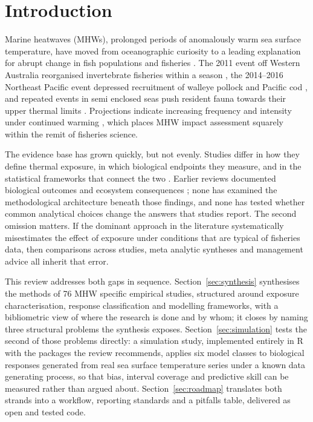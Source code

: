\documentclass[12pt,a4paper]{article}
\begin{document}
\section{Introduction}\label{sec:intro}

Marine heatwaves (MHWs), prolonged periods of anomalously warm sea surface temperature, have moved from oceanographic curiosity to a leading explanation for abrupt change in fish populations and fisheries \citep{hobday2016,smale2019}. The 2011 event off Western Australia reorganised invertebrate fisheries within a season \citep{caputi2016}, the 2014--2016 Northeast Pacific event depressed recruitment of walleye pollock and Pacific cod \citep{rogers2021,barbeaux2020}, and repeated events in semi enclosed seas push resident fauna towards their upper thermal limits \citep{benhasan2019}. Projections indicate increasing frequency and intensity under continued warming \citep{frolicher2018,cheng2022}, which places MHW impact assessment squarely within the remit of fisheries science.

The evidence base has grown quickly, but not evenly. Studies differ in how they define thermal exposure, in which biological endpoints they measure, and in the statistical frameworks that connect the two \citep{smith2025,fredston2023}. Earlier reviews documented biological outcomes and ecosystem consequences \citep{smale2019,holbrook2022}; none has examined the methodological architecture beneath those findings, and none has tested whether common analytical choices change the answers that studies report. The second omission matters. If the dominant approach in the literature systematically misestimates the effect of exposure under conditions that are typical of fisheries data, then comparisons across studies, meta analytic syntheses and management advice all inherit that error.

This review addresses both gaps in sequence. Section~\ref{sec:synthesis} synthesises the methods of 76 MHW specific empirical studies, structured around exposure characterisation, response classification and modelling frameworks, with a bibliometric view of where the research is done and by whom; it closes by naming three structural problems the synthesis exposes. Section~\ref{sec:simulation} tests the second of those problems directly: a simulation study, implemented entirely in R with the packages the review recommends, applies six model classes to biological responses generated from real sea surface temperature series under a known data generating process, so that bias, interval coverage and predictive skill can be measured rather than argued about. Section~\ref{sec:roadmap} translates both strands into a workflow, reporting standards and a pitfalls table, delivered as open and tested code.
\end{document}
